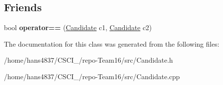 \subsection*{Friends}
\begin{DoxyCompactItemize}
\item 
\mbox{\label{classCandidate_ab8aa4bfa45d2a47423d3c31bacc7c293}} 
bool {\bfseries operator==} (\hyperlink{classCandidate}{Candidate} c1, \hyperlink{classCandidate}{Candidate} c2)
\end{DoxyCompactItemize}


The documentation for this class was generated from the following files\+:\begin{DoxyCompactItemize}
\item 
/home/hans4837/\+C\+S\+C\+I\+\_/repo-\/\+Team16/src/Candidate.\+h\item 
/home/hans4837/\+C\+S\+C\+I\+\_/repo-\/\+Team16/src/Candidate.\+cpp\end{DoxyCompactItemize}
